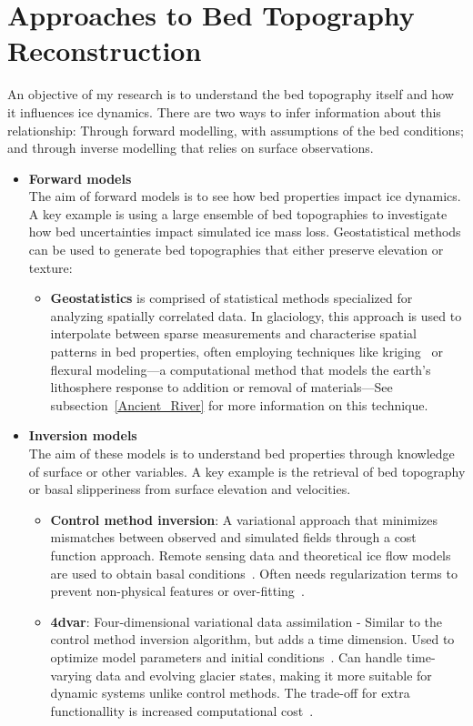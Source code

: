 \section{Approaches to Bed Topography Reconstruction}
An objective of my research is to understand the bed topography itself and how it influences ice dynamics. There are two ways to infer information about this relationship: Through forward modelling, with assumptions of the bed conditions; and through inverse modelling that relies on surface observations.
\begin{itemize}
    \item\textbf{Forward models}\\
    The aim of forward models is to see how bed properties impact ice dynamics. A key example is using a large ensemble of bed topographies to investigate how bed uncertainties impact simulated ice mass loss. Geostatistical methods can be used to generate bed topographies that either preserve elevation or texture:    
    \begin{itemize}
            \item\textbf{Geostatistics} is comprised of statistical methods specialized for analyzing spatially correlated data. In glaciology, this approach is used to interpolate between sparse measurements and characterise spatial patterns in bed properties, often employing techniques like kriging~\cite{Mackie_2020} or flexural modeling—a computational method that models the earth's lithosphere response to addition or removal of materials—See subsection~\ref{Ancient_River} for more information on this technique.
    \end{itemize}
    \item\textbf{Inversion models}\\
    The aim of these models is to understand bed properties through knowledge of surface or other variables. A key example is the retrieval of bed topography or basal slipperiness from surface elevation and velocities.
        \begin{itemize}
            \item\textbf{Control method inversion}: A variational approach that minimizes mismatches between observed and simulated fields through a cost function approach. Remote sensing data and theoretical ice flow models are used to obtain basal conditions~\cite{deRydt_2013}. Often needs regularization terms to prevent non-physical features or over-fitting~\cite{Morlighem_Goldberg_2024}.
            \item\textbf{4dvar}: Four-dimensional variational data assimilation - Similar to the control method inversion algorithm, but adds a time dimension. Used to optimize model parameters and initial conditions~\cite{Morlighem_Goldberg_2024}. Can handle time-varying data and evolving glacier states, making it more suitable for dynamic systems unlike control methods. The trade-off for extra functionallity is increased computational cost~\cite{Morlighem_Goldberg_2024}.

\end{itemize}
\end{itemize}
